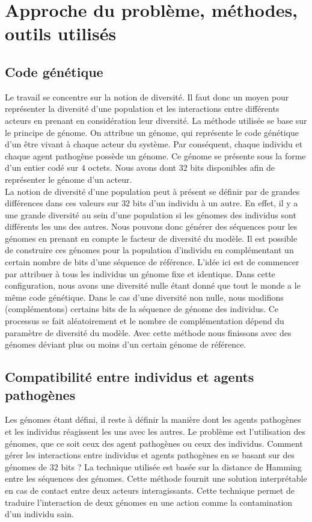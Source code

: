 \chapter{Approche du problème, méthodes, outils utilisés} \label{ch:approche}

\section{Code génétique}
Le travail se concentre sur la notion de diversité. Il faut donc un moyen pour représenter la diversité d'une population et les interactions entre différents acteurs en prenant en considération leur diversité. La méthode utilisée se base sur le principe de génome. On attribue un génome, qui représente le code génétique d'un être vivant à chaque acteur du système. Par conséquent, chaque individu et chaque agent pathogène possède un génome. Ce génome se présente sous la forme d'un entier codé sur $4$ octets. Nous avons dont $32$ bits disponibles afin de représenter le génome d'un acteur.\\

La notion de diversité d'une population peut à présent se définir par de grandes différences dans ces valeurs sur $32$ bits d'un individu à un autre. En effet, il y a une grande diversité au sein d'une population si les génomes des individus sont différents les uns des autres. Nous pouvons donc générer des séquences pour les génomes en prenant en compte le facteur de diversité du modèle. Il est possible de construire ces génomes pour la population d'individu en complémentant un certain nombre de bits d'une séquence de référence. L'idée ici est de commencer par attribuer à tous les individus un génome fixe et identique. Dans cette configuration, nous avons une diversité nulle étant donné que tout le monde a le même code génétique. Dans le cas d'une diversité non nulle, nous modifions (complémentons) certains bits de la séquence de génome des individus. Ce processus se fait aléatoirement et le nombre de complémentation dépend du paramètre de diversité du modèle. Avec cette méthode nous finissons avec des génomes déviant plus ou moins d'un certain génome de référence.\\

\section{Compatibilité entre individus et agents pathogènes}
Les génomes étant défini, il reste à définir la manière dont les agents pathogènes et les individus réagissent les uns avec les autres. Le problème est l'utilisation des génomes, que ce soit ceux des agent pathogènes ou ceux des individus. Comment gérer les interactions entre individus et agents pathogènes en se basant sur des génomes de $32$ bits ? La technique utilisée est basée sur la distance de Hamming entre les séquences des génomes. Cette méthode fournit une solution interprétable en cas de contact entre deux acteurs interagissants. Cette technique permet de traduire l'interaction de deux génomes en une action comme la contamination d'un individu sain.\\

